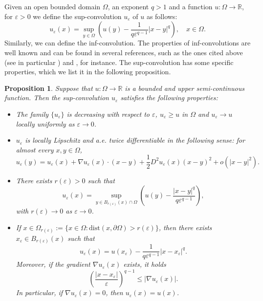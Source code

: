 \documentclass[12pt]{amsart}
\newtheorem{proposition}[theorem]{Proposition}
\newcommand{\R}{\mathbb R}
\newcommand{\1}{\mathbf 1}
\begin{document}
Given an open bounded domain $\Omega$, an exponent $q>1$ and a function $u:\Omega\to\R$, for $\varepsilon>0$ we define the sup-convolution $u_{\varepsilon}$ of $u$ as follows:
\begin{equation}\label{inf-convo}
u_{\varepsilon}(x)=\mathop{\sup}_{y\in\Omega} \left( u(y)-\frac{1}{q\varepsilon^{q-1}}|x-y|^q\right),\quad x\in \Omega.
\end{equation}
Similarly, we can define the inf-convolution. The properties of inf-convolutions are well known and can be found in several references, such as the ones cited above (see in particular \cite[Appendix A]{Versa-Julin2012}) and \cite{Katzourakis, Koike}, for instance. The sup-convolution has some specific properties, which we list it in the following proposition.
\begin{proposition}\label{inf-convo-prop}
Suppose that $u:\Omega \rightarrow \R$ is a bounded and upper semi-continuous function. Then the sup-convolution $u_\varepsilon$ satisfies the following properties:
\begin{itemize}
  \item The family $\{ u_\varepsilon\}$ is decreasing with respect to $\varepsilon$, $u_\varepsilon \geq u$ in $\Omega$ and $u_\varepsilon \rightarrow u$ locally uniformly as $\varepsilon \rightarrow  0$.

   \item $u_\varepsilon$ is locally Lipschitz and a.e. twice differentiable in the following sense: for almost every $x,y\in\Omega$,
      \[
      u_\varepsilon(y)=u_\varepsilon(x)+\nabla u_\varepsilon(x)\cdot (x-y)+\frac{1}{2}D^2 u_\varepsilon (x)(x-y)^2+o(|x-y|^2).
      \]

  \item There exists $r(\varepsilon )>0$ such that
  \[
  u_\varepsilon(x)=\mathop{\sup}_{y\in B_{r(\varepsilon)}(x)\cap \Omega} \left( u(y)-\frac{|x-y|^q}{q\varepsilon^{q-1}}\right), \]
  with $r(\varepsilon)\rightarrow 0 $ as $\varepsilon \rightarrow 0$.

  \item If $x\in \Omega_{r(\varepsilon)}:=\{ x\in \Omega: \mathrm{dist}(x,\partial \Omega)>r(\varepsilon)\}$, then there exists $x_\varepsilon\in B_{r(\varepsilon)}(x)$ such that
  \[
  u_{\varepsilon}(x)=u(x_\varepsilon)-\frac{1}{q\varepsilon^{q-1}}|x-x_\varepsilon|^q.
  \]
  Moreover, if the gradient $\nabla u_\varepsilon(x)$ exists, it holds
  \[
  \left( \frac{|x-x_\varepsilon|}{\varepsilon}\right)^{q-1} \leq |\nabla u_\varepsilon(x)|.
  \]
  In particular, if $\nabla u_\varepsilon (x)=0$, then $u_\varepsilon (x)=u(x)$.



\end{itemize}
\end{proposition}
\end{document}
